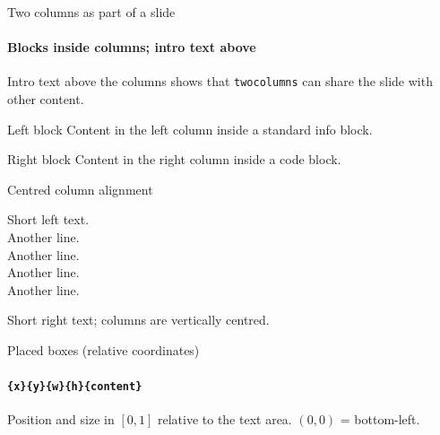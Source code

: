 \documentclass[sans,numeric,titlesplit]{qslides}
\begin{document}
\begin{frame}{Two columns as part of a slide}
  \framesubtitle{Blocks inside columns; intro text above}
  Intro text above the columns shows that \texttt{twocolumns} can share
  the slide with other content.
  \begin{twocolumns}[t]
    \begin{leftcolumn}
      \begin{block}{Left block}
        Content in the left column inside a standard info block.
      \end{block}
    \end{leftcolumn}
    \begin{rightcolumn}
      \begin{codeblock}{Right block}
        Content in the right column inside a code block.
      \end{codeblock}
    \end{rightcolumn}
  \end{twocolumns}
\end{frame}

\begin{frame}{Centred column alignment}
  \begin{twocolumns}[c]
    \begin{leftcolumn}
      Short left text.\\
      Another line.\\
      Another line.\\
      Another line.\\
      Another line.
    \end{leftcolumn}
    \begin{rightcolumn}
      Short right text; columns are vertically centred.
    \end{rightcolumn}
  \end{twocolumns}
\end{frame}

\begin{frame}{Placed boxes (relative coordinates)}
  \framesubtitle{\texttt{\string\placebox\{x\}\{y\}\{w\}\{h\}\{content\}}}
  Position and size in $[0,1]$ relative to the text area. $(0,0)$ = bottom-left.
\end{frame}
\end{document}
